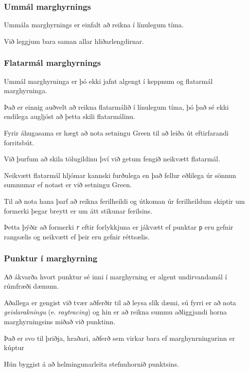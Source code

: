 {
	\frametitle{Ummál marghyrnings}
	{
		\item<1-> Ummála marghyrnings er einfalt að reikna í línulegum tíma.
		\item<2-> Við leggjum bara saman allar hliðarlengdirnar.
		\item<3->[] 
	}
}

{
	\frametitle{Flatarmál marghyrnings}
	{
		\item<1-> Ummál marghyrninga er þó ekki jafnt algengt í keppnum og flatarmál marghyrninga.
		\item<2-> Það er einnig auðvelt að reikna flatarmálið í línulegum tíma, þó það sé ekki
			endilega augljóst að þetta skili flatarmálinu.
		\item<3-> Fyrir áhugasama er hægt að nota setningu Green til að leiða út eftirfarandi forritsbút.
		\item<4->[] 
	}
}

{
	{
		\item<1-> Við þurfum að skila tölugildinu því við getum fengið neikvætt flatarmál.
		\item<2-> Neikvætt flatarmál hljómar kannski furðulega en það fellur eðlilega úr sönnun summunar
			ef notast er við setningu Green.
		\item<3-> Til að nota hana þarf að reikna ferilheildi og útkoman úr ferilheildum skiptir
			um formerki þegar breytt er um átt stikunar ferilsins.
		\item<4-> Þetta þýðir að formerki \texttt{r} eftir forlykkjuna er jákvætt ef punktar \texttt{p} 
			eru gefnir rangsælis og neikvætt ef þeir eru gefnir réttsælis.
	}
}

{
	\frametitle{Punktur í marghyrning}
	{
		\item<1-> Að ákvarða hvort punktur sé inni í marghyrning er algent undirvandamál í rúmfræði dæmum.
		\item<2-> Aðallega er gengist við tvær aðferðir til að leysa slík dæmi, sú fyrri er að nota \emph{geislarakningu}
			(e. \emph{raytracing}) og hin er að reikna summu aðliggjandi horna marghyrningsins miðað við punktinn.
		\item<3-> Það er svo til þriðja, hraðari, aðferð sem virkar bara ef marghynrningurinn er kúptur
		\item<4-> Hún byggist á að helmingunarleita stefnuhornið punktsins.
	}
}

